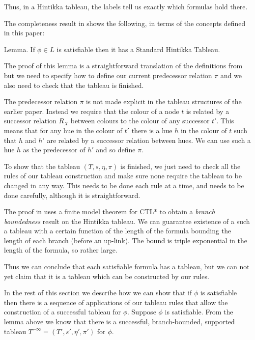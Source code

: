 \documentclass[submission,copyright,creativecommons]{eptcs}
\newenvironment{lemma}{Lemma. }{}
\begin{document}
Thus, in a Hintikka tableau, the
labels tell us exactly which formulas
hold there.

The completeness result in \cite{Rey:startab}
shows the following, in terms of the concepts defined
in this paper:

\begin{lemma}
If $\phi \in L$ is satisfiable
then it has a
Standard Hintikka Tableau.
\end{lemma}

The proof of this lemma is a straightforward
translation of the definitions from \cite{Rey:startab}
but we need to specify how to define our current predecessor relation
$\pi$ and we also need to
check that the tableau is finished.

The predecessor relation $\pi$ is not made explicit in the tableau
structures of the earlier paper.
Instead we require that the
colour of  a node $t$ is related by a
successor relation $R_X$ between colours
to the colour of any successor $t'$.
This means that for any hue in the colour of $t'$
there is a hue $h$ in the colour of $t$
such that $h$ and $h'$ are related by
a successor relation between hues.
We can use such a hue $h$ as the predecessor of $h'$
and so define $\pi$.

To show that the tableau $(T,s,\eta,\pi)$
is finished,
we just need to check 
all the rules of our tableau construction
and make sure none
require the tableau to be changed in any way.
This needs to be done each rule at a time,
and needs to be done carefully,
although it is straightforward.

The proof in \cite{Rey:startab}
uses a finite model theorem
for CTL* 
to obtain a {\em branch boundedness}
result on the Hintikka tableau.
We can guarantee existence of a such a tableau
with a certain function of the length
of the formula bounding  the length of each branch
(before an up-link).
The bound is triple exponential in the
length of the formula, so rather large.

Thus we can conclude that each satisfiable formula
has a tableau,
but we can not yet claim that it
is a tableau which can be constructed
by our rules.

In the rest of this section we 
describe how
we can show that if $\phi$ is satisfiable
then there is a sequence 
of applications of our tableau rules 
that allow the construction of 
a successful tableau for $\phi$.
Suppose $\phi$ is satisfiable.
From the lemma above we
know that there is a successful, branch-bounded, supported
tableau $T^{- \infty}=(T',s',\eta',\pi')$ for 
$\phi$.
\end{document}
